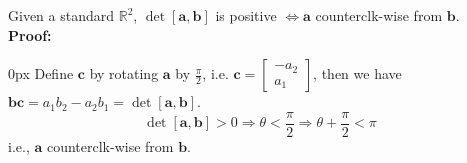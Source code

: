 \documentclass{article}
\begin{document}
Given a standard $\mathbb{R}^2$, $\det [\mathbf{a, b}]$ is positive $\iff \mathbf{a}$ counterclk-wise from $\mathbf{b}$.\\
\textbf{Proof:}
\begin{addmargin}[10px]{0px}
    Define $\mathbf{c}$ by rotating $\mathbf{a}$ by $\frac{\pi}{2}$, i.e. $\mathbf{c} = \begin{bmatrix}
        -a_2\\
        a_1
    \end{bmatrix}$, then we have $\mathbf{bc} = a_1b_2 - a_2b_1 = \det [\mathbf{a, b}]$.\\
    \begin{equation*}
        \det [\mathbf{a, b}] > 0 \Rightarrow \theta < \frac{\pi}{2} \Rightarrow \theta + \frac{\pi}{2} < \pi
    \end{equation*}
    i.e., $\mathbf{a}$ counterclk-wise from $\mathbf{b}$.
\end{addmargin}
\end{document}
